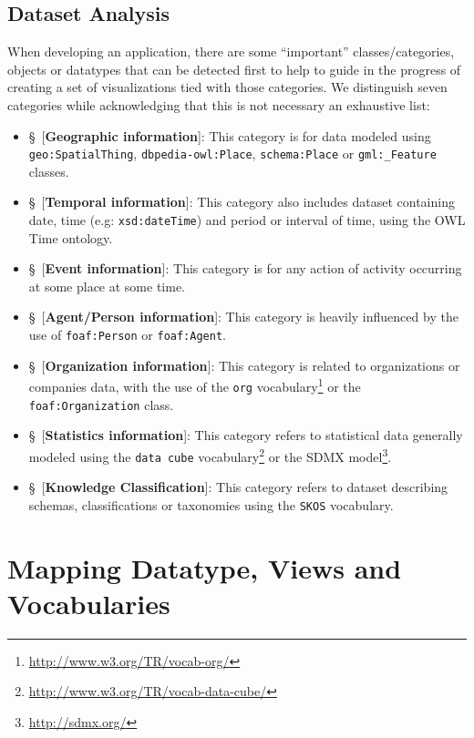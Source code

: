 \subsection{Dataset Analysis}
\label{sec:vizTypes}
When developing an application, there are some ``important'' classes/categories, objects or datatypes that can be detected first to help to guide in the progress of creating a set of visualizations tied with those categories. We distinguish seven categories while acknowledging that this is not necessary an exhaustive list:
\begin{itemize}
 \item{\S~[\textbf{Geographic information}]}: This category is for data modeled using \texttt{geo:SpatialThing}, \texttt{dbpedia-owl:Place}, \texttt{schema:Place} or \texttt{gml:\_Feature} classes.
 \item{\S~[\textbf{Temporal information}]}: This category also includes dataset containing date, time (e.g: \texttt{xsd:dateTime}) and period or interval of time, using the OWL Time ontology.
 \item{\S~[\textbf{Event information}]}: This category is for any action of activity occurring at some place at some time.
 \item{\S~[\textbf{Agent/Person information}]}: This category is heavily influenced by the use of \texttt{foaf:Person} or \texttt{foaf:Agent}.
 \item{\S~[\textbf{Organization information}]}: This category is related to organizations or companies data, with the use of the \texttt{org} vocabulary\footnote{\url{http://www.w3.org/TR/vocab-org/}} or the \texttt{foaf:Organization} class.
 \item{\S~[\textbf{Statistics information}]}: This category refers to statistical data generally modeled using the \texttt{data cube} vocabulary\footnote{\url{http://www.w3.org/TR/vocab-data-cube/}} or the SDMX model\footnote{\url{http://sdmx.org/}}.
 \item{\S~[\textbf{Knowledge Classification}]}: This category refers to dataset describing schemas, classifications or taxonomies using the \texttt{SKOS} vocabulary.
\end{itemize}



\section{Mapping Datatype, Views and Vocabularies}
\label{sec:mapping}

